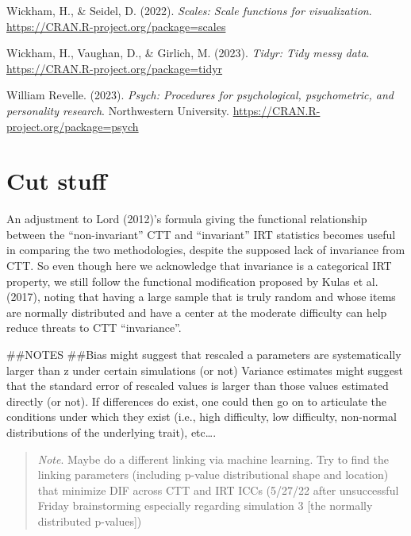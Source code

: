 \documentclass[
  jou]{apa6}
\newlength{\cslhangindent}
\newlength{\cslentryspacingunit} %
\newenvironment{CSLReferences}[2] %
 {%
  \setlength{\parindent}{0pt}
  \ifodd #1
  \let\oldpar\par
  \def\par{\hangindent=\cslhangindent\oldpar}
  \fi
  \setlength{\parskip}{#2\cslentryspacingunit}
 }%
 {}
\begin{document}
\begin{CSLReferences}{1}{0}
\leavevmode{}%
Wickham, H., \& Seidel, D. (2022). \emph{Scales: Scale functions for visualization}. \url{https://CRAN.R-project.org/package=scales}

\leavevmode{}%
Wickham, H., Vaughan, D., \& Girlich, M. (2023). \emph{Tidyr: Tidy messy data}. \url{https://CRAN.R-project.org/package=tidyr}

\leavevmode{}%
William Revelle. (2023). \emph{Psych: Procedures for psychological, psychometric, and personality research}. Northwestern University. \url{https://CRAN.R-project.org/package=psych}

\end{CSLReferences}

\endgroup

\hypertarget{appendix-appendices}{%
\appendix}


\hypertarget{cut-stuff}{%
\section{Cut stuff}\label{cut-stuff}}

An adjustment to Lord (2012)'s formula giving the functional relationship between the ``non-invariant'' CTT and ``invariant'' IRT statistics becomes useful in comparing the two methodologies, despite the supposed lack of invariance from CTT. So even though here we acknowledge that invariance is a categorical IRT property, we still follow the functional modification proposed by Kulas et al. (2017), noting that having a large sample that is truly random and whose items are normally distributed and have a center at the moderate difficulty can help reduce threats to CTT ``invariance''.

\#\#NOTES
\#\#Bias might suggest that rescaled a parameters are systematically larger than z under certain simulations (or not) Variance estimates might suggest that the standard error of rescaled values is larger than those values estimated directly (or not). If differences do exist, one could then go on to articulate the conditions under which they exist (i.e., high difficulty, low difficulty, non-normal distributions of the underlying trait), etc\ldots.

\begin{quote}
\emph{Note}. Maybe do a different linking via machine learning. Try to find the linking parameters (including p-value distributional shape and location) that minimize DIF across CTT and IRT ICCs (5/27/22 after unsuccessful Friday brainstorming especially regarding simulation 3 {[}the normally distributed p-values{]})
\end{quote}
\end{document}
